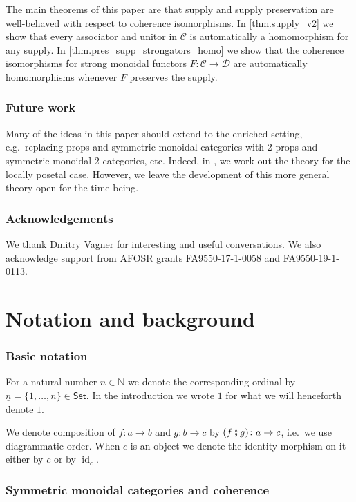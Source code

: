 \documentclass[11pt, oneside, article]{memoir}
\theoremstyle{plain}
\theoremstyle{definition}
\theoremstyle{remark}
\newcommand{\ord}[1]{\underline{#1}}%
\newcommand{\cat}[1]{\mathcal{#1}}%
\newcommand{\Cat}[1]{{\mathsf{#1}}}%
\DeclareMathOperator{\id}{id}
\newcommand{\smset}{\Cat{Set}}
\newcommand{\nn}{\mathbb{N}}
\newcommand{\cp}{\mathbin{\fatsemi}}
\begin{document}
The main theorems of this paper are that supply and supply preservation are well-behaved with respect to coherence isomorphisms. In \cref{thm.supply_v2} we show that every associator and unitor in $\cat{C}$ is automatically a homomorphism for any supply. In \cref{thm.pres_supp_strongators_homo} we show that the coherence isomorphisms for strong monoidal functors $F\colon\cat{C}\to\cat{D}$ are automatically homomorphisms whenever $F$ preserves the supply.
 

\subsection{Future work}

Many of the ideas in this paper should extend to the enriched setting, e.g.\ replacing props and symmetric monoidal categories with 2-props and symmetric monoidal 2-categories, etc. Indeed, in \cite{fong2019abelian}, we work out the theory for the locally posetal case. However, we leave the development of this more general theory open for the time being.

\subsection{Acknowledgements}
We thank Dmitry Vagner for interesting and useful conversations. We also acknowledge support from AFOSR grants FA9550-17-1-0058 and FA9550-19-1-0113.


\chapter{Notation and background}

\subsection{Basic notation}
For a natural number $n\in\nn$ we denote the corresponding ordinal by $\ord{n}=\{1,\ldots,n\}\in\smset$. In the introduction we wrote $1$ for what we will henceforth denote $\ord{1}$.

We denote composition of $f\colon a\to b$ and $g\colon b\to c$ by $(f\cp g)\colon a\to c$, i.e.\ we use diagrammatic order. When $c$ is an object we denote the identity morphism on it either by $c$ or by $\id_c$.

\subsection{Symmetric monoidal categories and coherence}
\end{document}
